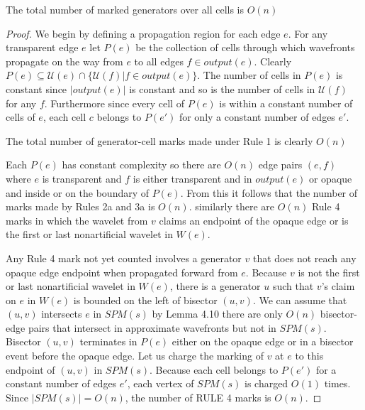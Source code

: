 \begin{Lemma} \label{lemma:4.11HershbergerS99}
	The total number of marked generators over all cells is $O(n)$
\end{Lemma}
\begin{proof}
	We begin by defining a propagation region for each edge $e$. For any
	transparent edge $e$ let $P(e)$ be the collection of cells through which
	wavefronts propagate on the way from $e$ to all edges $f \in output(e)$.
	Clearly $P(e)\subseteq \mathcal{U}(e) \cap \{\mathcal{U}(f)|f\in
	output(e)\}$. The number of cells in $P(e)$ is constant since $|output(e)|$
	is constant and so is the number of cells in $\mathcal{U}(f)$ for any $f$.
	Furthermore since every cell of $P(e)$ is within a constant number of cells
	of $e$, each cell $c$ belongs to $P(e')$ for only a constant number of edges
	$e'$.

	The total number of generator-cell marks made under Rule 1 is clearly $O(n)$

	Each $P(e)$ has constant complexity so there are $O(n)$ edge pairs $(e,f)$
	where $e$ is transparent and $f$ is either transparent and in $output(e)$ or
	opaque and inside or on the boundary of $P(e)$. From this it follows that
	the number of marks made by Rules 2a and 3a is $O(n)$. similarly there are
	$O(n)$ Rule 4 marks in which the wavelet from $v$ claims an endpoint of the
	opaque edge or is the first or last nonartificial wavelet in $W(e)$.

	Any Rule 4 mark not yet counted involves a generator $v$ that does not reach
	any opaque edge endpoint when propagated forward from $e$. Because $v$ is
	not the first or last nonartificial wavelet in $W(e)$, there is a generator
	$u$ such that $v$'s claim on $e$ in $W(e)$ is bounded on the left of
	bisector $(u,v)$. We can assume that $(u,v)$ intersects $e$ in $SPM(s)$ by
	Lemma 4.10 there are only $O(n)$ bisector-edge pairs that intersect in
	approximate wavefronts but not in $SPM(s)$. Bisector $(u,v)$ terminates in
	$P(e)$ either on the opaque edge or in a bisector event before the opaque
	edge. Let us charge the
	marking of $v$ at $e$ to this endpoint of $(u,v)$ in $SPM(s)$. Because each
	cell belongs to $P(e')$ for a constant number of edges $e'$, each vertex of
	$SPM(s)$ is charged $O(1)$ times. Since $|SPM(s)|=O(n)$, the number of RULE
	4 marks is $O(n)$.


\end{proof}
